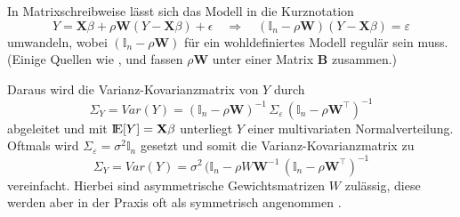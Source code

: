 In Matrixschreibweise lässt sich das Modell in die Kurznotation
\begin{equation*}
    Y=\mathbf{X} \beta + \rho \mathbf{W} (Y-\mathbf{X} \beta) + \epsilon \quad \Rightarrow \quad  (\mathds{I}_{n}-\rho \mathbf{W}) (Y-\mathbf{X} \beta) = \varepsilon
\end{equation*}
umwandeln, wobei $(\mathds{I}_{n}-\rho \mathbf{W})$ für ein wohldefiniertes Modell regulär sein muss.
(Einige Quellen wie  \cite[S.440]{cressie_statistics_1993}, \cite[S.363]{waller_applied_2004} 
und \cite[S. 293]{bivand_applied_2013} fassen $\rho \mathbf{W} $ unter einer Matrix $ \mathbf{B}$ zusammen.)

Daraus wird die Varianz-Kovarianzmatrix von $Y$ durch
\begin{equation*}
    \Sigma_{Y}=Var(Y) = (\mathds{I}_{n}-\rho \mathbf{W})^{-1} \, \Sigma_{\varepsilon} \, (\mathds{I}_{n}-\rho \mathbf{W}^{\top})^{-1}
\end{equation*}
abgeleitet und mit ${\rm I\!E}[Y]=\mathbf{X} \beta$ unterliegt $Y$ einer multivariaten Normalverteilung. 
Oftmals wird $\Sigma_{\varepsilon}=\sigma^{2} \mathds{I}_{n}$ gesetzt und somit die Varianz-Kovarianzmatrix zu
\begin{equation*}
    \Sigma_{Y}=Var(Y) = \sigma^{2} \, (\mathds{I}_{n}-\rho W\mathbf{W}^{-1} \, (\mathds{I}_{n}-\rho \mathbf{W}^{\top})^{-1}
\end{equation*}
vereinfacht. Hierbei sind asymmetrische Gewichtsmatrizen $W$ zulässig, diese werden aber in der Praxis 
oft als symmetrisch angenommen \cite[S. 294]{bivand_applied_2013}.

